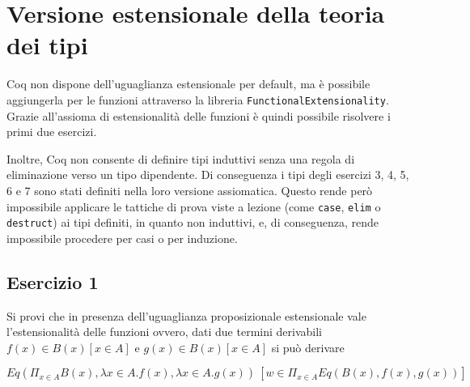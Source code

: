 \newpage
\section{Versione estensionale della teoria dei tipi}
Coq non dispone dell'uguaglianza estensionale per default, ma è possibile aggiungerla per le funzioni attraverso la libreria \texttt{FunctionalExtensionality}. Grazie all'assioma di estensionalità delle funzioni è quindi possibile risolvere i primi due esercizi.

Inoltre, Coq non consente di definire tipi induttivi senza una regola di eliminazione verso un tipo dipendente. Di conseguenza i tipi degli esercizi 3, 4, 5, 6 e 7 sono stati definiti nella loro versione assiomatica. Questo rende però impossibile applicare le tattiche di prova viste a lezione (come \texttt{case}, \texttt{elim} o \texttt{destruct}) ai tipi definiti, in quanto non induttivi, e, di conseguenza, rende impossibile procedere per casi o per induzione.

%

\subsection{Esercizio 1}
\begin{thm}
	Si provi che in presenza dell’uguaglianza proposizionale estensionale vale l’estensionalità delle funzioni ovvero, dati due termini derivabili $f(x)\in B(x) [x\in A]$ e $g(x)\in B(x) [x\in A]$ si può	derivare
	
	\[ Eq(\Pi_{x\in A}B(x), \lambda x\in A.f(x), \lambda x\in A.g(x))~[w\in \Pi_{x\in A}Eq(B(x), f(x), g(x))]\]
\end{thm}


